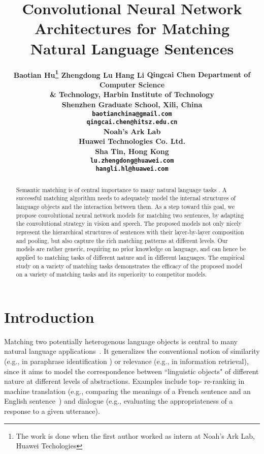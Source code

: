\documentclass{article} \usepackage{nips14submit_e,times}
\title{Convolutional Neural Network  Architectures for Matching Natural Language Sentences}
\author{
\bf{Baotian Hu}\thanks{The work is done when the first author worked as intern at
Noah's Ark Lab, Huawei Techologies}
\And
\bf{Zhengdong Lu}
\And
\bf{Hang Li}
\And
\bf{Qingcai Chen}
\AND
Department of Computer Science\\
\& Technology, Harbin Institute of Technology\\
Shenzhen Graduate School, Xili, China \\
\texttt{baotianchina@gmail.com}\\
\texttt{qingcai.chen@hitsz.edu.cn}\\
\And
 Noah's Ark Lab \\
Huawei Technologies Co. Ltd.\\
Sha Tin, Hong Kong \\
\texttt{lu.zhengdong@huawei.com}\\
\texttt{hangli.hl@huawei.com}\\
}
\newcommand{\0}{\ensuremath{\mathbf{0}}}
\newcommand{\1}{\ensuremath{\mathbf{1}}}
\begin{document}
\maketitle

\begin{abstract}
Semantic matching is of central importance to many natural language tasks \cite{bordes2014semantic,RetrievalQA}. A successful matching algorithm needs to adequately model the internal structures of language objects and the interaction between them. As a step toward this goal, we propose convolutional neural network models for matching two sentences, by adapting the convolutional strategy in vision and speech.  The proposed models not only nicely represent the hierarchical structures of sentences with their layer-by-layer composition and pooling, but also capture the rich matching patterns at different levels. Our models are rather generic, requiring no prior knowledge on language, and can hence be applied to matching tasks of different nature and in different languages. The empirical study on a variety of matching tasks demonstrates the efficacy of the proposed model on a variety of matching tasks and its superiority to competitor models.
\end{abstract}

\section{Introduction} \vspace{-10pt}
Matching two potentially heterogenous language objects is central to many natural language applications~\cite{RetrievalQA,bordes2014semantic}. It generalizes the conventional notion of similarity (e.g., in paraphrase identification \cite{socher2011}) or relevance (e.g., in information retrieval\cite{wu2013learning}), since it aims to model the correspondence between ``linguistic objects" of different nature at different levels of abstractions. Examples include top- re-ranking in  machine translation (e.g., comparing the meanings of a French sentence and an English sentence~\cite{ibmmodel}) and dialogue (e.g., evaluating the appropriateness of a response to a given utterance\cite{emnlpmatch}).
\end{document}
